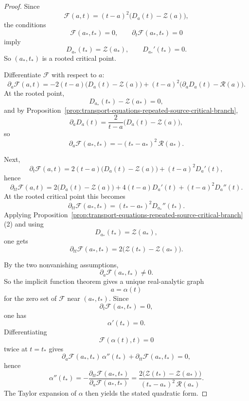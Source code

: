 \documentclass[11pt,a4paper]{amsart}
\theoremstyle{plain}
\theoremstyle{definition}
\begin{document}
\begin{proof}
Since
\[
\mathscr F(a,t)=(t-a)^2\bigl(D_a(t)-\mathcal Z(a)\bigr),
\]
the conditions
\[
\mathscr F(a_*,t_*)=0,
\qquad
\partial_t\mathscr F(a_*,t_*)=0
\]
imply
\[
D_{a_*}(t_*)=\mathcal Z(a_*),
\qquad
D_{a_*}'(t_*)=0.
\]
So $(a_*,t_*)$ is a rooted critical point.

Differentiate $\mathscr F$ with respect to $a$:
\[
\partial_a\mathscr F(a,t)
=
-2(t-a)\bigl(D_a(t)-\mathcal Z(a)\bigr)
+(t-a)^2\bigl(\partial_aD_a(t)-\mathcal R(a)\bigr).
\]
At the rooted point,
\[
D_{a_*}(t_*)-\mathcal Z(a_*)=0,
\]
and by
Proposition~\ref{prop:transport-equations-repeated-source-critical-branch},
\[
\partial_aD_a(t)=\frac{2}{t-a}\bigl(D_a(t)-\mathcal Z(a)\bigr),
\]
so
\[
\partial_a\mathscr F(a_*,t_*)
=
-(t_*-a_*)^2\,\mathcal R(a_*).
\]

Next,
\[
\partial_t\mathscr F(a,t)
=
2(t-a)\bigl(D_a(t)-\mathcal Z(a)\bigr)
+(t-a)^2D_a'(t),
\]
hence
\[
\partial_{tt}\mathscr F(a,t)
=
2\bigl(D_a(t)-\mathcal Z(a)\bigr)
+4(t-a)D_a'(t)
+(t-a)^2D_a''(t).
\]
At the rooted critical point this becomes
\[
\partial_{tt}\mathscr F(a_*,t_*)
=
(t_*-a_*)^2D_{a_*}''(t_*).
\]
Applying
Proposition~\ref{prop:transport-equations-repeated-source-critical-branch}(2)
and using
\[
D_{a_*}(t_*)=\mathcal Z(a_*),
\]
one gets
\[
\partial_{tt}\mathscr F(a_*,t_*)
=
2\bigl(\mathcal Z(t_*)-\mathcal Z(a_*)\bigr).
\]

By the two nonvanishing assumptions,
\[
\partial_a\mathscr F(a_*,t_*)\neq 0.
\]
So the implicit function theorem gives a unique real-analytic graph
\[
a=\alpha(t)
\]
for the zero set of $\mathscr F$ near $(a_*,t_*)$. Since
\[
\partial_t\mathscr F(a_*,t_*)=0,
\]
one has
\[
\alpha'(t_*)=0.
\]
Differentiating
\[
\mathscr F(\alpha(t),t)=0
\]
twice at $t=t_*$ gives
\[
\partial_a\mathscr F(a_*,t_*)\,\alpha''(t_*)
+
\partial_{tt}\mathscr F(a_*,t_*)=0,
\]
hence
\[
\alpha''(t_*)
=
-\frac{\partial_{tt}\mathscr F(a_*,t_*)}
{\partial_a\mathscr F(a_*,t_*)}
=
\frac{2\bigl(\mathcal Z(t_*)-\mathcal Z(a_*)\bigr)}
{(t_*-a_*)^2\,\mathcal R(a_*)}.
\]
The Taylor expansion of $\alpha$ then yields the stated quadratic form.
\end{proof}
\end{document}
